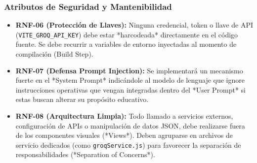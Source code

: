\subsubsection{Atributos de Seguridad y Mantenibilidad}
\begin{itemize}
    \item \textbf{RNF-06 (Protección de Llaves):} Ninguna credencial, token o llave de API (\texttt{VITE\_GROQ\_API\_KEY}) debe estar *harcodeada* directamente en el código fuente. Se debe recurrir a variables de entorno inyectadas al momento de compilación (Build Step).
    \item \textbf{RNF-07 (Defensa Prompt Injection):} Se implementará un mecanismo fuerte en el *System Prompt* indicándole al modelo de lenguaje que ignore instrucciones operativas que vengan integradas dentro del *User Prompt* si estas buscan alterar su propósito educativo.
    \item \textbf{RNF-08 (Arquitectura Limpia):} Todo llamado a servicios externos, configuración de APIs o manipulación de datos JSON, debe realizarse fuera de los componentes visuales (*Views*). Deben agruparse en archivos de servicio dedicados (como \texttt{groqService.js}) para favorecer la separación de responsabilidades (*Separation of Concerns*).
\end{itemize}
